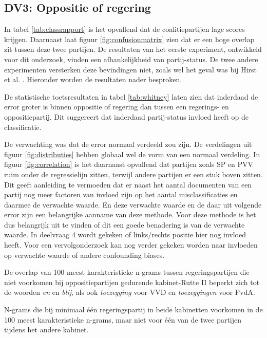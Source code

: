 \subsection{DV3: Oppositie of regering}
In tabel \ref{tab:classrapport} is het opvallend dat de coalitiepartijen lage scores krijgen. Daarnaast laat figuur \ref{fig:confusionmatrix} zien dat er een hoge overlap zit tussen deze twee partijen. De resultaten van het eerste experiment, ontwikkeld voor dit onderzoek, vinden een afhankelijkheid van partij-status. De twee andere experimenten versterken deze bevindingen niet, zoals wel het geval was bij Hirst et al. \cite{Hirst_textto}. Hieronder worden de resultaten nader besproken. \par
De statistische toetsresultaten in tabel \ref{tab:whitney} laten zien dat inderdaad de error groter is binnen oppositie of regering dan tussen een regerings- en oppositiepartij. Dit suggereert dat inderdaad partij-status invloed heeft op de classificatie. \par
De verwachting was dat de error normaal verdeeld zou zijn. De verdelingen uit figuur \ref{fig:distributies} hebben globaal wel de vorm van een normaal verdeling. In figuur \ref{fig:correlation} is het daarnaast opvallend dat partijen zoals SP en PVV ruim onder de regressielijn zitten, terwijl andere partijen er een stuk boven zitten. Dit geeft aanleiding te vermoeden dat er naast het aantal documenten van een partij nog meer factoren van invloed zijn op het aantal misclassificaties en daarmee de verwachte waarde. En deze verwachte waarde en de daar uit volgende error zijn een belangrijke aanname van deze methode. Voor deze methode is het dus belangrijk uit te vinden of dit een goede benadering is van de verwachte waarde. In deelvraag 4 wordt gekeken of links/rechts positie hier nog invloed heeft. Voor een vervolgonderzoek kan nog verder gekeken worden naar invloeden op verwachte waarde of andere confounding biases.\par
De overlap van 100 meest karakteristieke n-grams tussen regeringspartijen die niet voorkomen bij oppositiepartijen gedurende kabinet-Rutte II beperkt zich tot de woorden \textit{en} en \textit{blij}, als ook \textit{toezegging} voor VVD en \textit{toezeggingen} voor PvdA.\par
\begin{table}[H]
\label{tab:overlapkabinetten}
\caption{N-grams die bij minimaal één regeringspartij in beide kabinetten voorkomen in de 100 meest karakteristieke n-grams, maar niet voor één van de twee partijen tijdens het andere kabinet.}
\centering
 
\end{table}
